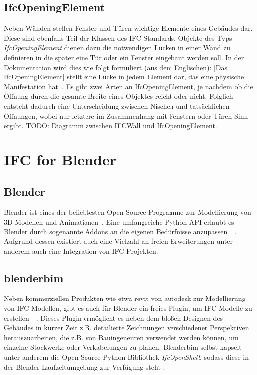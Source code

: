 \subsection{IfcOpeningElement}\label{basics:IfcOpeningElement}
Neben Wänden stellen Fenster und Türen wichtige Elemente eines Gebäudes dar.
Diese sind ebenfalls Teil der Klassen des IFC Standards.
Objekte des Typs \textit{IfcOpeningElement} dienen dazu die notwendigen Lücken in einer Wand zu definieren in die später eine Tür oder ein Fenster eingebaut werden soll.
In der Dokumentation wird dies wie folgt formuliert (aus dem Englischen): \glqq{}[Das IfcOpeningElement] stellt eine Lücke in jedem Element dar, das eine physische Manifestation hat\grqq{}~\cite{IFC4310OpeningElement:online}.
Es gibt zwei Arten an IfcOpeningElement, je nachdem ob die Öffnung durch die gesamte Breite eines Objektes reicht oder nicht. 
Folglich entsteht dadurch eine Unterscheidung zwischen Nischen und tatsächlichen Öffnungen, wobei nur letztere im Zusammenhang mit Fenstern oder Türen Sinn ergibt.
TODO: Diagramm zwischen IFCWall und IfcOpeningElement.

\section{IFC for Blender}\label{basics:blender}
\subsection{Blender}
Blender ist eines der beliebtesten Open Source Programme zur Modellierung von 3D Modellen und Animationen~\cite{blendero56:online}.
Eine umfangreiche Python API erlaubt es Blender durch sogenannte Addons an die eigenen Bedürfnisse anzupassen~\cite{PythonWebsite:online}~\cite{BlenderPythonAPI:online}.
Aufgrund dessen existiert auch eine Vielzahl an freien Erweiterungen \textendash{} unter anderem auch eine Integration von IFC Projekten.

\subsection{blenderbim}\label{basics:blenderbim}
Neben kommerziellen Produkten wie etwa revit von autodesk zur Modellierung von IFC Modellen, gibt es auch für Blender ein freies Plugin, um IFC Modelle zu erstellen~\cite{RevitSof26:online}~\cite{BlenderB43:online}.
Dieses Plugin ermöglicht es neben dem bloßen Designen des Gebäudes in kurzer Zeit z.B. detailierte Zeichnungen verschiedener Perspektiven herauszuarbeiten, die z.B. von Bauingeneuren verwendet werden können, um einzelne Stockwerke oder Verkabelungen zu planen.
Blenderbim selbst kapselt unter anderem die Open Source Python Bibliothek \textit{IfcOpenShell}, sodass diese in der Blender Laufzeitumgebung zur Verfügung steht \cite{IFCOpenShell:online}.

